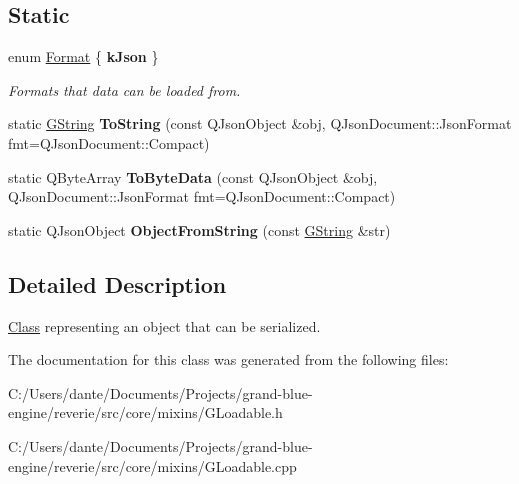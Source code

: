 \subsection*{Static}
\begin{DoxyCompactItemize}
\item 
\mbox{\label{classrev_1_1_serializable_ac2279bc0fd05f9c2459a6b7258e43fa8}} 
enum \mbox{\hyperlink{classrev_1_1_serializable_ac2279bc0fd05f9c2459a6b7258e43fa8}{Format}} \{ {\bfseries k\+Json}
 \}
\begin{DoxyCompactList}\small\item\em Formats that data can be loaded from. \end{DoxyCompactList}\item 
\mbox{\label{classrev_1_1_serializable_a03c1bd7fec1d4b61454047cf9f30969a}} 
static \mbox{\hyperlink{classrev_1_1_g_string}{G\+String}} {\bfseries To\+String} (const Q\+Json\+Object \&obj, Q\+Json\+Document\+::\+Json\+Format fmt=Q\+Json\+Document\+::\+Compact)
\item 
\mbox{\label{classrev_1_1_serializable_a8a92217fefe852855da51ea0afbf98ad}} 
static Q\+Byte\+Array {\bfseries To\+Byte\+Data} (const Q\+Json\+Object \&obj, Q\+Json\+Document\+::\+Json\+Format fmt=Q\+Json\+Document\+::\+Compact)
\item 
\mbox{\label{classrev_1_1_serializable_a7f70ac17716e66e914eeb6a811a8405c}} 
static Q\+Json\+Object {\bfseries Object\+From\+String} (const \mbox{\hyperlink{classrev_1_1_g_string}{G\+String}} \&str)
\end{DoxyCompactItemize}


\subsection{Detailed Description}
\mbox{\hyperlink{struct_class}{Class}} representing an object that can be serialized. 

The documentation for this class was generated from the following files\+:\begin{DoxyCompactItemize}
\item 
C\+:/\+Users/dante/\+Documents/\+Projects/grand-\/blue-\/engine/reverie/src/core/mixins/G\+Loadable.\+h\item 
C\+:/\+Users/dante/\+Documents/\+Projects/grand-\/blue-\/engine/reverie/src/core/mixins/G\+Loadable.\+cpp\end{DoxyCompactItemize}
